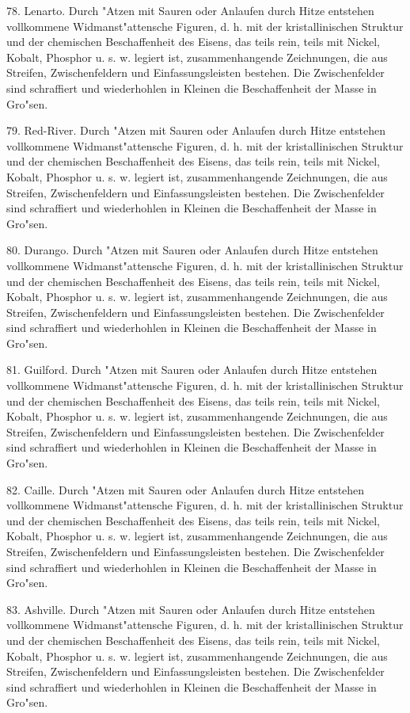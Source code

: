 \documentclass[a4paper, 11pt, oneside, polutonikogreek, german]{article}
\begin{document}
78. Lenarto. Durch "Atzen mit Sauren oder Anlaufen durch Hitze entstehen vollkommene Widmanst"attensche Figuren, d. h. mit der kristallinischen Struktur und der chemischen Beschaffenheit des Eisens, das teils rein, teils mit Nickel, Kobalt, Phosphor u. s. w. legiert ist, zusammenhangende Zeichnungen, die aus Streifen, Zwischenfeldern und Einfassungsleisten bestehen. Die Zwischenfelder sind schraffiert und wiederhohlen in Kleinen die Beschaffenheit der Masse in Gro"sen.

79. Red-River. Durch "Atzen mit Sauren oder Anlaufen durch Hitze entstehen vollkommene Widmanst"attensche Figuren, d. h. mit der kristallinischen Struktur und der chemischen Beschaffenheit des Eisens, das teils rein, teils mit Nickel, Kobalt, Phosphor u. s. w. legiert ist, zusammenhangende Zeichnungen, die aus Streifen, Zwischenfeldern und Einfassungsleisten bestehen. Die Zwischenfelder sind schraffiert und wiederhohlen in Kleinen die Beschaffenheit der Masse in Gro"sen.

80. Durango. Durch "Atzen mit Sauren oder Anlaufen durch Hitze entstehen vollkommene Widmanst"attensche Figuren, d. h. mit der kristallinischen Struktur und der chemischen Beschaffenheit des Eisens, das teils rein, teils mit Nickel, Kobalt, Phosphor u. s. w. legiert ist, zusammenhangende Zeichnungen, die aus Streifen, Zwischenfeldern und Einfassungsleisten bestehen. Die Zwischenfelder sind schraffiert und wiederhohlen in Kleinen die Beschaffenheit der Masse in Gro"sen.

81. Guilford. Durch "Atzen mit Sauren oder Anlaufen durch Hitze entstehen vollkommene Widmanst"attensche Figuren, d. h. mit der kristallinischen Struktur und der chemischen Beschaffenheit des Eisens, das teils rein, teils mit Nickel, Kobalt, Phosphor u. s. w. legiert ist, zusammenhangende Zeichnungen, die aus Streifen, Zwischenfeldern und Einfassungsleisten bestehen. Die Zwischenfelder sind schraffiert und wiederhohlen in Kleinen die Beschaffenheit der Masse in Gro"sen.

82. Caille. Durch "Atzen mit Sauren oder Anlaufen durch Hitze entstehen vollkommene Widmanst"attensche Figuren, d. h. mit der kristallinischen Struktur und der chemischen Beschaffenheit des Eisens, das teils rein, teils mit Nickel, Kobalt, Phosphor u. s. w. legiert ist, zusammenhangende Zeichnungen, die aus Streifen, Zwischenfeldern und Einfassungsleisten bestehen. Die Zwischenfelder sind schraffiert und wiederhohlen in Kleinen die Beschaffenheit der Masse in Gro"sen.

83. Ashville. Durch "Atzen mit Sauren oder Anlaufen durch Hitze entstehen vollkommene Widmanst"attensche Figuren, d. h. mit der kristallinischen Struktur und der chemischen Beschaffenheit des Eisens, das teils rein, teils mit Nickel, Kobalt, Phosphor u. s. w. legiert ist, zusammenhangende Zeichnungen, die aus Streifen, Zwischenfeldern und Einfassungsleisten bestehen. Die Zwischenfelder sind schraffiert und wiederhohlen in Kleinen die Beschaffenheit der Masse in Gro"sen.
\end{document}
